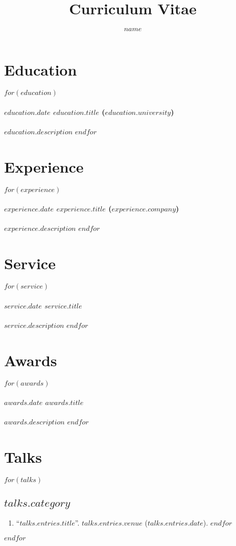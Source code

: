 \documentclass[11pt]{article}
\title{Curriculum Vitae}
\author{$name$}
\begin{document}
\maketitle

\section*{Education}
$for(education)$
\paragraph{$education.date$ $education.title$ ($education.university$)}
$education.description$
$endfor$

\section*{Experience}
$for(experience)$
\paragraph{$experience.date$ $experience.title$ ($experience.company$)}
$experience.description$
$endfor$

\section*{Service}
$for(service)$
\paragraph{$service.date$ $service.title$}
$service.description$
$endfor$

\section*{Awards}
$for(awards)$
\paragraph{$awards.date$ $awards.title$}
$awards.description$
$endfor$

\section*{Talks}
$for(talks)$
\subsection*{$talks.category$}
\begin{enumerate}
$for(talks.entries)$
\item ``\href{$talks.entires.link$}{$talks.entries.title$}''. $talks.entries.venue$ ($talks.entries.date$).
$endfor$
\end{enumerate}
$endfor$
\end{document}
